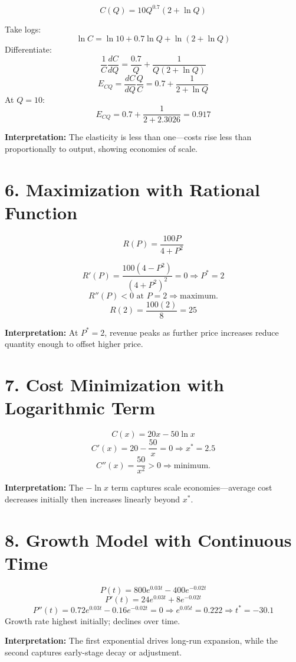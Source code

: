 \documentclass[12pt]{article}
\begin{document}
\[
C(Q)=10Q^{0.7}(2+\ln Q)
\]

Take logs:
\[
\ln C=\ln10+0.7\ln Q+\ln(2+\ln Q)
\]
Differentiate:
\[
\frac{1}{C}\frac{dC}{dQ}=\frac{0.7}{Q}+\frac{1}{Q(2+\ln Q)}
\]
\[
E_{CQ}=\frac{dC}{dQ}\frac{Q}{C}=0.7+\frac{1}{2+\ln Q}
\]
At \(Q=10\):
\[
E_{CQ}=0.7+\frac{1}{2+2.3026}=0.917
\]

\begin{tcolorbox}
\textbf{Interpretation:} The elasticity is less than one—costs rise less than proportionally to output, showing economies of scale.
\end{tcolorbox}


\newpage
\section*{6. Maximization with Rational Function}

\[
R(P)=\frac{100P}{4+P^2}
\]

\[
R'(P)=\frac{100(4-P^2)}{(4+P^2)^2}=0\Rightarrow P^*=2
\]
\[
R''(P)<0\text{ at } P=2\Rightarrow\text{maximum.}
\]
\[
R(2)=\frac{100(2)}{8}=25
\]

\textbf{Interpretation:}  
At $P^*=2$, revenue peaks as further price increases reduce quantity enough to offset higher price.



\section*{7. Cost Minimization with Logarithmic Term}

\[
C(x)=20x-50\ln x
\]
\[
C'(x)=20-\frac{50}{x}=0\Rightarrow x^*=2.5
\]
\[
C''(x)=\frac{50}{x^2}>0\Rightarrow \text{minimum.}
\]

\textbf{Interpretation:}  
The $-\ln x$ term captures scale economies—average cost decreases initially then increases linearly beyond $x^*$.



\section*{8. Growth Model with Continuous Time}

\[
P(t)=800e^{0.03t}-400e^{-0.02t}
\]
\[
P'(t)=24e^{0.03t}+8e^{-0.02t}
\]
\[
P''(t)=0.72e^{0.03t}-0.16e^{-0.02t}=0
\Rightarrow e^{0.05t}=0.222\Rightarrow t^*=-30.1
\]
Growth rate highest initially; declines over time.

\begin{tcolorbox}
\textbf{Interpretation:} The first exponential drives long-run expansion, while the second captures early-stage decay or adjustment.
\end{tcolorbox}
\end{document}
